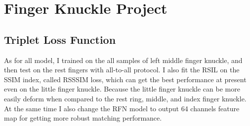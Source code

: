 \section{Finger Knuckle Project}
\subsection{Triplet Loss Function}
As for all model, I trained on the all samples of left middle finger knuckle, and then test on the rest fingers with all-to-all protocol. I also fit the RSIL on the SSIM index, called RSSSIM loss, which can get the best performance at present even on the little finger knuckle. Because the little finger knuckle can be more easily deform when compared to the rest ring, middle, and index finger knuckle. At the same time I also change the RFN model to output 64 channels feature map for getting more robust matching performance.

